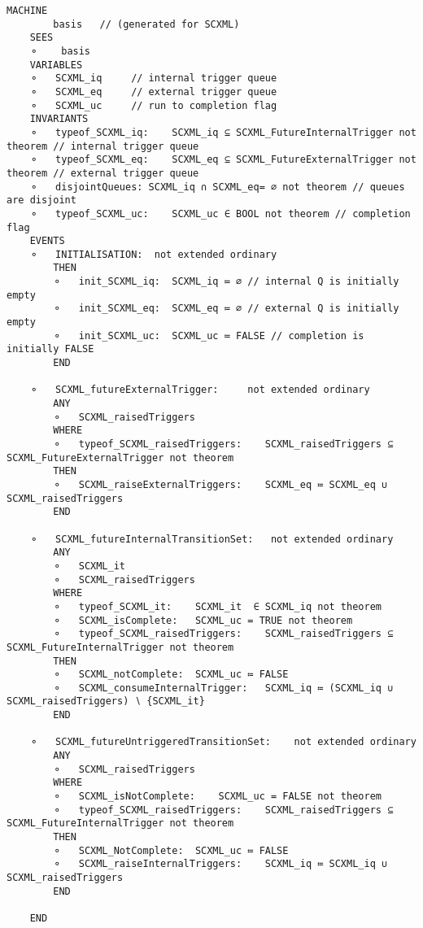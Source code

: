 \begin{lstlisting}[caption={Machine for abstract basis}, label={lst:BasisMachine},language=Event-B, escapechar=|]
MACHINE
		basis 	// (generated for SCXML)
	SEES
	⚬	 basis 
	VARIABLES
	⚬	SCXML_iq	 // internal trigger queue
	⚬	SCXML_eq	 // external trigger queue
	⚬	SCXML_uc	 // run to completion flag
	INVARIANTS
	⚬	typeof_SCXML_iq:	SCXML_iq ⊆ SCXML_FutureInternalTrigger not theorem // internal trigger queue
	⚬	typeof_SCXML_eq:	SCXML_eq ⊆ SCXML_FutureExternalTrigger not theorem // external trigger queue
	⚬	disjointQueues:	SCXML_iq ∩ SCXML_eq= ∅ not theorem // queues are disjoint
	⚬	typeof_SCXML_uc:	SCXML_uc ∈ BOOL not theorem // completion flag
	EVENTS
	⚬	INITIALISATION:	 not extended ordinary 
		THEN
		⚬	init_SCXML_iq:	SCXML_iq ≔ ∅ // internal Q is initially empty
		⚬	init_SCXML_eq:	SCXML_eq ≔ ∅ // external Q is initially empty
		⚬	init_SCXML_uc:	SCXML_uc ≔ FALSE // completion is initially FALSE
		END

	⚬	SCXML_futureExternalTrigger:	 not extended ordinary 
		ANY
		⚬	SCXML_raisedTriggers	 
		WHERE
		⚬	typeof_SCXML_raisedTriggers:	SCXML_raisedTriggers ⊆ SCXML_FutureExternalTrigger not theorem 
		THEN
		⚬	SCXML_raiseExternalTriggers:	SCXML_eq ≔ SCXML_eq ∪ SCXML_raisedTriggers 
		END

	⚬	SCXML_futureInternalTransitionSet:	 not extended ordinary 
		ANY
		⚬	SCXML_it	 
		⚬	SCXML_raisedTriggers	 
		WHERE
		⚬	typeof_SCXML_it:	SCXML_it  ∈ SCXML_iq not theorem 
		⚬	SCXML_isComplete:	SCXML_uc = TRUE not theorem 
		⚬	typeof_SCXML_raisedTriggers:	SCXML_raisedTriggers ⊆ SCXML_FutureInternalTrigger not theorem 
		THEN
		⚬	SCXML_notComplete:	SCXML_uc ≔ FALSE 
		⚬	SCXML_consumeInternalTrigger:	SCXML_iq ≔ (SCXML_iq ∪ SCXML_raisedTriggers) ∖ {SCXML_it} 
		END

	⚬	SCXML_futureUntriggeredTransitionSet:	 not extended ordinary 
		ANY
		⚬	SCXML_raisedTriggers	 
		WHERE
		⚬	SCXML_isNotComplete:	SCXML_uc = FALSE not theorem 
		⚬	typeof_SCXML_raisedTriggers:	SCXML_raisedTriggers ⊆ SCXML_FutureInternalTrigger not theorem 
		THEN
		⚬	SCXML_NotComplete:	SCXML_uc ≔ FALSE 
		⚬	SCXML_raiseInternalTriggers:	SCXML_iq ≔ SCXML_iq ∪ SCXML_raisedTriggers 
		END

	END
\end{lstlisting}


